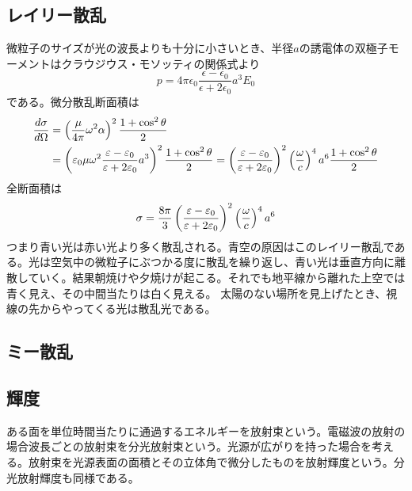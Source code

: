 \subsection{レイリー散乱}
    微粒子のサイズが光の波長よりも十分に小さいとき、半径$a$の誘電体の双極子モーメントはクラウジウス・モソッティの関係式より
        \[p = 4\pi\epsilon_0\frac{\epsilon - \epsilon_0}{\epsilon + 2\epsilon_0}a^3E_0\]
    である。微分散乱断面積は
    \begin{align*}
        \de[\sigma]{\Omega}
            &= \lr{\frac{\mu}{4\pi}\omega^2\alpha}^2\frac{1 + \cos^2\theta}{2}\\
            &= \lr{\epsilon_0\mu\omega^2\frac{\epsilon - \epsilon_0}{\epsilon + 2\epsilon_0}a^3}^2\frac{1 + \cos^2\theta}{2} = \lr{\frac{\epsilon - \epsilon_0}{\epsilon + 2\epsilon_0}}^2\lr{\frac{\omega}{c}}^4a^6\frac{1 + \cos^2\theta}{2}
    \end{align*}
    全断面積は
    \begin{align*}
        \sigma = \frac{8\pi}{3}\lr{\frac{\epsilon - \epsilon_0}{\epsilon + 2\epsilon_0}}^2\lr{\frac{\omega}{c}}^4a^6
    \end{align*}
    つまり青い光は赤い光より多く散乱される。青空の原因はこのレイリー散乱である。光は空気中の微粒子にぶつかる度に散乱を繰り返し、青い光は垂直方向に離散していく。結果朝焼けや夕焼けが起こる。それでも地平線から離れた上空では青く見え、その中間当たりは白く見える。
    太陽のない場所を見上げたとき、視線の先からやってくる光は散乱光である。

\subsection{ミー散乱}

\subsection{輝度}
    ある面を単位時間当たりに通過するエネルギーを放射束という。電磁波の放射の場合波長ごとの放射束を分光放射束という。光源が広がりを持った場合を考える。放射束を光源表面の面積とその立体角で微分したものを放射輝度という。分光放射輝度も同様である。